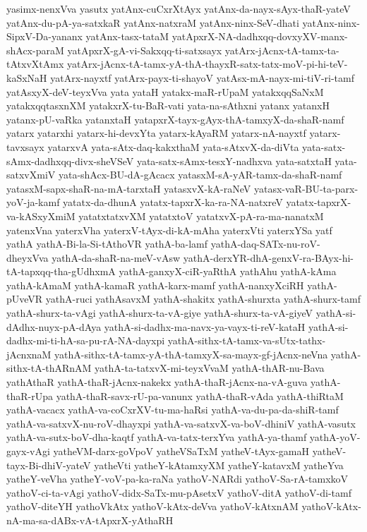{yasimx-nenxVva
yasutx
yatAnx-cuCxrXtAyx
yatAnx-da-nayx-sAyx-thaR-yateV
yatAnx-du-pA-ya-satxkaR
yatAnx-natxraM
yatAnx-ninx-SeV-dhati
yatAnx-ninx-SipxV-Da-yananx
yatAnx-tasx-tataM
yatApxrX-NA-dadhxqq-dovxyXV-manx-shAcx-paraM
yatApxrX-gA-vi-Sakxqq-ti-satxsayx
yatArx-jAcnx-tA-tamx-ta-tAtxvXtAmx
yatArx-jAcnx-tA-tamx-yA-thA-thayxR-satx-tatx-moV-pi-hi-teV-kaSxNaH
yatArx-nayxtf
yatArx-payx-ti-shayoV
yatAsx-mA-nayx-mi-tiV-ri-tamf
yatAsxyX-deV-teyxVva
yata
yataH
yatakx-maR-rUpaM
yatakxqqSaNxM
yatakxqqtasxnXM
yatakxrX-tu-BaR-vati
yata-na-sAthxni
yatanx
yatanxH
yatanx-pU-vaRka
yatanxtaH
yatapxrX-tayx-gAyx-thA-tamxyX-da-shaR-namf
yatarx
yatarxhi
yatarx-hi-devxYta
yatarx-kAyaRM
yatarx-nA-nayxtf
yatarx-tavxsayx
yatarxvA
yata-sAtx-daq-kakxthaM
yata-sAtxvX-da-diVta
yata-satx-sAmx-dadhxqq-divx-sheVSeV
yata-satx-sAmx-tesxY-nadhxva
yata-satxtaH
yata-satxvXmiV
yata-shAcx-BU-dA-gAcacx
yatasxM-sA-yAR-tamx-da-shaR-namf
yatasxM-sapx-shaR-na-mA-tarxtaH
yatasxvX-kA-raNeV
yatasx-vaR-BU-ta-parx-yoV-ja-kamf
yatatx-da-dhunA
yatatx-tapxrX-ka-ra-NA-natxreV
yatatx-tapxrX-va-kASxyXmiM
yatatxtatxvXM
yatatxtoV
yatatxvX-pA-ra-ma-nanatxM
yatenxVna
yaterxVha
yaterxV-tAyx-di-kA-mAha
yaterxVti
yaterxYSa
yatf
yathA
yathA-Bi-la-Si-tAthoVR
yathA-ba-lamf
yathA-daq-SATx-nu-roV-dheyxVva
yathA-da-shaR-na-meV-vAsw
yathA-derxYR-dhA-genxV-ra-BAyx-hi-tA-tapxqq-tha-gUdhxmA
yathA-ganxyX-ciR-yaRthA
yathAhu
yathA-kAma
yathA-kAmaM
yathA-kamaR
yathA-karx-mamf
yathA-nanxyXciRH
yathA-pUveVR
yathA-ruci
yathAsavxM
yathA-shakitx
yathA-shurxta
yathA-shurx-tamf
yathA-shurx-ta-vAgi
yathA-shurx-ta-vA-giye
yathA-shurx-ta-vA-giyeV
yathA-si-dAdhx-nuyx-pA-dAya
yathA-si-dadhx-ma-navx-ya-vayx-ti-reV-kataH
yathA-si-dadhx-mi-ti-hA-sa-pu-rA-NA-dayxpi
yathA-sithx-tA-tamx-va-sUtx-tathx-jAcnxnaM
yathA-sithx-tA-tamx-yA-thA-tamxyX-sa-mayx-gf-jAcnx-neVna
yathA-sithx-tA-thARnAM
yathA-ta-tatxvX-mi-teyxVvaM
yathA-thAR-nu-Bava
yathAthaR
yathA-thaR-jAcnx-nakekx
yathA-thaR-jAcnx-na-vA-guva
yathA-thaR-rUpa
yathA-thaR-savx-rU-pa-vanunx
yathA-thaR-vAda
yathA-thiRtaM
yathA-vacacx
yathA-va-coCxrXV-tu-ma-haRsi
yathA-va-du-pa-da-shiR-tamf
yathA-va-satxvX-nu-roV-dhayxpi
yathA-va-satxvX-va-boV-dhiniV
yathA-vasutx
yathA-va-sutx-boV-dha-kaqtf
yathA-va-tatx-terxYva
yathA-ya-thamf
yathA-yoV-gayx-vAgi
yatheVM-darx-goVpoV
yatheVSaTxM
yatheV-tAyx-gamaH
yatheV-tayx-Bi-dhiV-yateV
yatheVti
yatheY-kAtamxyXM
yatheY-katavxM
yatheYva
yatheY-veVha
yatheY-voV-pa-ka-raNa
yathoV-NARdi
yathoV-Sa-rA-tamxkoV
yathoV-ci-ta-vAgi
yathoV-didx-SaTx-mu-pAsetxV
yathoV-ditA
yathoV-di-tamf
yathoV-diteYH
yathoVkAtx
yathoV-kAtx-deVva
yathoV-kAtxnAM
yathoV-kAtx-nA-ma-sa-dABx-vA-tApxrX-yAthaRH
}
